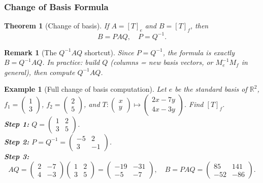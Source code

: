 \documentclass{article}
\newtheorem{theorem}{Theorem}
\newtheorem*{example}{Example}
\newtheorem{remark}{Remark}
\begin{document}
\subsubsection{Change of Basis Formula}
\begin{theorem}[Change of basis]
    If $A=[T]_e$ and $B=[T]_f$, then
    \[B = PAQ, \quad P = Q^{-1}.\]
\end{theorem}
\begin{remark}[The $Q^{-1}AQ$ shortcut]
    Since $P = Q^{-1}$, the formula is exactly $B = Q^{-1}AQ$. In practice: build $Q$ (columns = new basis vectors, or $M_e^{-1}M_f$ in general), then compute $Q^{-1}AQ$.
\end{remark}
\begin{example}[Full change of basis computation]
    Let $e$ be the standard basis of $\mathbb{R}^2$, $f_1=\begin{pmatrix}1\\3\end{pmatrix}$, $f_2=\begin{pmatrix}2\\5\end{pmatrix}$, and $T:\begin{pmatrix}x\\y\end{pmatrix}\mapsto\begin{pmatrix}2x-7y\\4x-3y\end{pmatrix}$. Find $[T]_f$.\\
    \textbf{Step 1:} $Q=\begin{pmatrix}1&2\\3&5\end{pmatrix}$.\\
    \textbf{Step 2:} $P=Q^{-1}=\begin{pmatrix}-5&2\\3&-1\end{pmatrix}$.\\
    \textbf{Step 3:}
    \[AQ=\begin{pmatrix}2&-7\\4&-3\end{pmatrix}\begin{pmatrix}1&2\\3&5\end{pmatrix}=\begin{pmatrix}-19&-31\\-5&-7\end{pmatrix},\quad B=PAQ=\begin{pmatrix}85&141\\-52&-86\end{pmatrix}.\]
\end{example}
\end{document}
